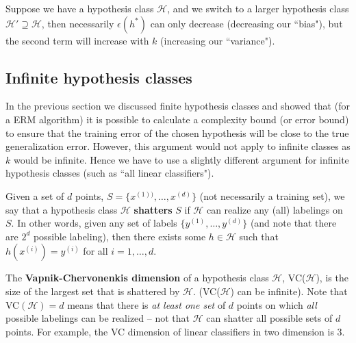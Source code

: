 \documentclass[letterpaper,10pt]{article}
\begin{document}
Suppose we have a hypothesis class $\mathscr{H}$, and we switch to a larger hypothesis class $\mathscr{H'} \supseteq \mathscr{H}$, then necessarily $\epsilon(h^*)$ can only decrease (decreasing our ``bias"), but the second term will increase with $k$ (increasing our ``variance").


\subsection{Infinite hypothesis classes}

In the previous section we discussed finite hypothesis classes and showed that (for a ERM algorithm) it is possible to calculate a complexity bound (or error bound) to ensure that the training error of the chosen hypothesis will be close to the true generalization error. However, this argument would not apply to infinite classes as $k$ would be infinite. Hence we have to use a slightly different argument for infinite hypothesis classes (such as ``all linear classifiers").

Given a set of $d$ points, $S = \{x^{(1))},\ldots,x^{(d)}\}$ (not necessarily a training set), we say that a hypothesis class $\mathscr{H}$ \textbf{shatters} $S$ if $\mathscr{H}$ can realize any (all) labelings on $S$. In other words, given any set of labels $\{y^{(1)},\ldots,y^{(d)}\}$ (and note that there are $2^d$ possible labeling), then there exists some $h \in \mathscr{H}$ such that $h(x^{(i)}) = y^{(i)}$ for all $i=1,\ldots,d$.

The \textbf{Vapnik-Chervonenkis dimension} of a hypothesis class $\mathscr{H}$, VC($\mathscr{H}$), is the size of the largest set that is shattered by $\mathscr{H}$. (VC($\mathscr{H}$) can be infinite). Note that VC$(\mathscr{H})=d$ means that there is \textit{at least one set} of $d$ points on which \textit{all} possible labelings can be realized -- not that $\mathscr{H}$ can shatter all possible sets of $d$ points. For example, the VC dimension of linear classifiers in two dimension is 3.
\end{document}
